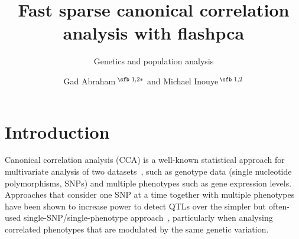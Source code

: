 \documentclass{bioinfo}
\begin{document}

\subtitle{Genetics and population analysis}

\title[Fast SCCA]{Fast sparse canonical correlation analysis with flashpca}
\author[Sample \textit{et~al}.]{Gad Abraham\,$^{\text{\sfb 1,2}*}$
and Michael Inouye\,$^{\text{\sfb 1,2}}$}
\address{$^{\text{\sf 1}}$ Centre for Systems Genomics, School of
BioSciences, University of Melbourne, Parkville 3010, VIC, Australia. \\
$^{\text{\sf 2}}$ Department of Pathology, Faculty of Medicine, Dentistry, and
Health Sciences, University of Melbourne,\\ Parkville 3010, VIC, Australia.}





\maketitle

\section{Introduction}

Canonical correlation analysis (CCA) is a well-known statistical approach
for multivariate analysis of two datasets~\citep{Hotelling1936}, such as
genotype data (single nucleotide polymorphisms, SNPs) and multiple phenotypes
such as gene expression levels. Approaches that consider one SNP at a time
together with multiple phenotypes have been shown to increase power to
detect QTLs over the simpler but often-used single-SNP/single-phenotype
approach~\citep{Ferreira2009,Inouye2012}, particularly when analysing
correlated phenotypes that are modulated by the same genetic variation.
\end{document}
